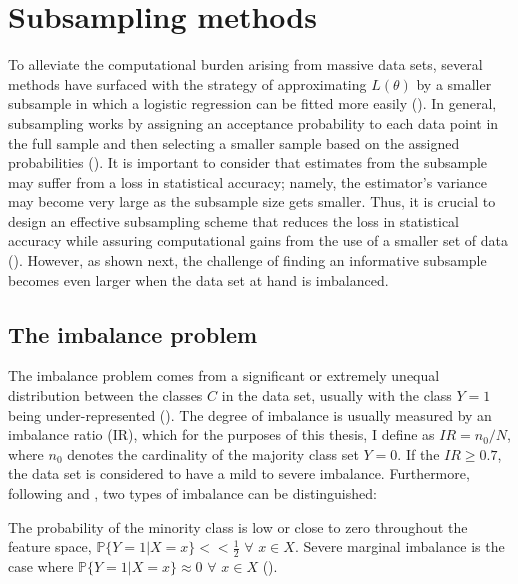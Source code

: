\section{Subsampling methods}
\label{sec:subsampling}


To alleviate the computational burden arising from massive data sets, several methods have surfaced with the strategy of approximating $L(\theta)$ by a smaller subsample in which a logistic regression can be fitted more easily (\cite{yu2023}). In general, subsampling works by assigning an acceptance probability to each data point in the full sample and then selecting a smaller sample  based on the assigned probabilities (\cite{han2020local}). It is important to consider that estimates from the subsample may suffer from a loss in statistical accuracy; namely, the estimator's variance may become very large as the subsample size gets smaller. Thus, it is crucial to design an effective subsampling scheme that reduces the loss in statistical accuracy while assuring computational gains from the use of a smaller set of data (\cite{han2020local}). However, as shown next, the challenge of finding an informative subsample becomes even larger when the data set at hand is imbalanced. 

\subsection{The imbalance problem}
\label{sec:imbalance}

The imbalance problem comes from a significant or extremely unequal distribution between the classes $C$ in the data set, usually with the class $Y=1$ being under-represented (\cite{he2019}). The degree of imbalance is usually measured by an imbalance ratio (IR), which for the purposes of this thesis, I define as $IR=n_0 / N$, where $n_0$ denotes the cardinality of the majority class set $Y=0$. If the $IR \geq 0.7$, the data set is considered to have a mild to severe imbalance. Furthermore, following \textcite{hastie2014} and \textcite{obrien2019}, two types of imbalance can be distinguished:

\begin{definition}
The probability of the minority class is low or close to zero throughout the feature space, $\mathbb{P}\{Y=1|X=x\} << \frac{1}{2}$ $\forall$ $x \in X$. Severe marginal imbalance is the case where $\mathbb{P}\{Y=1|X=x\} \approx 0$ $\forall$ $x \in X$ (\cite{obrien2019}).
\end{definition}

